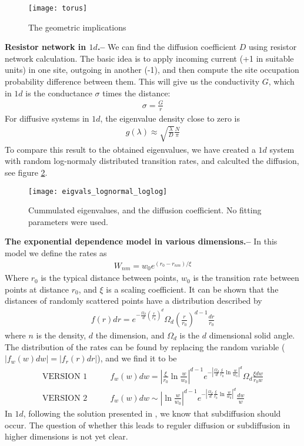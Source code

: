 \documentclass[onecolumn,fleqn,notitlepage,secnumarabic]{revtex4}
\begin{document}
\begin{figure}
    \texttt{[image: torus]}
    \caption{The geometric implications}\label{fig:torus}
\end{figure}


{\bf Resistor network in $1d$.--} We can find the diffusion coefficient $D$ using resistor network calculation. The basic idea is to apply incoming current (+1 in suitable units) in one site, outgoing in another (-1), and then compute the site occupation probability difference between them. This will give us the conductivity $G$, which in $1d$ is the conductance $\sigma$ times the distance:
\begin{align}
  \sigma = \frac{G}{r}
\end{align} 
For diffusive systems in $1d$, the eigenvalue density close to zero is 
\begin{align}
  g(\lambda) \approx \sqrt{\frac{\lambda}{D}}\frac{N}{\pi}
\end{align}
To compare this result to the obtained eigenvalues, we have created a $1d$ system with random log-normaly distributed transition rates, and calculted the diffusion, see figure \ref{fig:eigvals_lognormal}.
\begin{figure}\label{fig:eigvals_lognormal}
    \texttt{[image: eigvals\_lognormal\_loglog]}
    \caption{Cummulated eigenvalues, and the diffusion coefficient. No fitting parameters were used.}\label{fig:eigvals_lognormal}
\end{figure}

{ \bf The exponential dependence model in various dimensions.--} In this model we define the rates as 
\begin{align}
  W_{nm}= w_0 e^{(r_0-r_{nm})/ \xi}
\end{align}
Where $r_0$ is the typical distance between points, $w_0$ is the transition rate between points at distance $r_0$, and $\xi$ is a scaling coefficient. It can be shown that the distances of randomly scattered points have a distribution described by 
\begin{align}
  f(r)dr = e^{-\frac{\Omega_d}{d} (\frac{r}{r_0})^d} \Omega_d (\frac{r}{r_0})^{d-1}\frac{dr}{r_0}
\end{align}
where $n$ is the density, $d$ the dimension, and $\Omega_d$ is the $d$ dimensional solid angle. The distribution of the rates can be found by replacing the random variable ($|f_w(w)dw| = |f_r(r)dr|$), and we find it to be 
\begin{align}
\textrm{VERSION 1} &\qquad f_w(w)dw = \left|\frac{\xi}{r_0}\ln \frac{w}{w_0}\right|^{d-1} e^{-\left|\frac{\Omega_d}{d}\frac{\xi}{r_0}\ln \frac{w}{w_0}\right|^d} \Omega_d\frac{\xi dw}{r_0 w} \\
\textrm{VERSION 2} &\qquad f_w(w)dw \sim \left|\ln \frac{w}{w_0}\right|^{d-1} e^{-\left|\frac{\Omega_d}{d}\frac{\xi}{r_0}\ln \frac{w}{w_0}\right|^d} \frac{dw}{w}
\end{align}
In $1d$, following the solution presented in \cite{Alexander:1981:RMP}, we know that subdiffusion should occur. The question of whether this leads to reguler diffusion or subdiffusion in higher dimensions is not yet clear.
\end{document}
